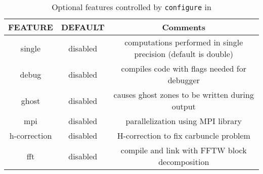\begin{table}[ht]
\caption{Optional features controlled by {\tt configure} in \ath}
\begin{center}
\begin{tabular}{|c|c|c|} \hline \hline
FEATURE & DEFAULT & Comments \\ \hline
single &  disabled & computations performed in single precision (default is double) \\
debug  & disabled & compiles code with flags needed for debugger \\
ghost  & disabled & causes ghost zones to be written during output \\
mpi    & disabled & parallelization using MPI library \\
h-correction & disabled & H-correction to fix carbuncle problem \\ 
fft & disabled & compile and link with FFTW block decomposition \\
\hline
\end{tabular}
\end{center}
\end{table}

